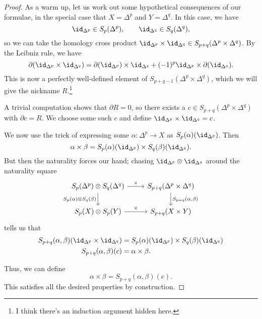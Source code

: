 \documentclass[main.tex]{subfiles}
\begin{document}
\begin{proof}
  As a warm up, let us work out some hypothetical consequences of our formulae, in the special case that $X = \Delta^{p}$ and $Y = \Delta^{q}$. In this case, we have
  \begin{equation*}
    \id_{\Delta^{p}} \in S_{p}(\Delta^{p}),\qquad \id_{\Delta^{q}} \in S_{q}(\Delta^{q}),
  \end{equation*}
  so we can take the homology cross product $\id_{\Delta^{p}} \times \id_{\Delta^{q}} \in S_{p+q}(\Delta^{p} \times \Delta^{q})$. By the Leibniz rule, we have
  \begin{equation*}
    \partial(\id_{\Delta^{p}} \times \id_{\Delta^{q}}) = \partial(\id_{\Delta^{p}}) \times \id_{\Delta^{q}} + (-1)^{p} \id_{\Delta^{p}} \times \partial(\id_{\Delta^{q}}).
  \end{equation*}
  This is now a perfectly well-defined element of $S_{p+q-1}(\Delta^{p} \times \Delta^{q})$, which we will give the nickname $R$.\footnote{I think there's an induction argument hidden here.}

  A trivial computation shows that $\partial R = 0$, so there exists a $c \in S_{p+q}(\Delta^{p} \times \Delta^{q})$ with $\partial c = R$. We choose some such $c$ and define $\id_{\Delta^{p}} \times \id_{\Delta^{q}} = c$.

  We now use the trick of expressing some $\alpha\colon \Delta^{p} \to X$ as $S_{p}(\alpha)(\id_{\Delta^{p}})$. Then
  \begin{equation*}
    \alpha \times \beta = S_{p}(\alpha)(\id_{\Delta^{p}}) \times S_{q}(\beta)(\id_{\Delta^{q}}).
  \end{equation*}
  But then the naturality forces our hand; chasing $\id_{\Delta^{p}} \otimes \id_{\Delta^{q}}$ around the naturality square
  \begin{equation*}
    \begin{tikzcd}
      S_{p}(\Delta^{p}) \otimes S_{q}(\Delta^{q})
      \arrow[r, "\times"]
      \arrow[d, swap, "{S_{p}(\alpha) \otimes S_{q}(\beta)}"]
      & S_{p+q}(\Delta^{p} \times \Delta^{q})
      \arrow[d, "{S_{p+q}(\alpha, \beta)}"]
      \\
      S_{p}(X) \otimes S_{p}(Y)
      \arrow[r, "\times"]
      & S_{p+q}(X \times Y)
    \end{tikzcd}
  \end{equation*}
  tells us that
  \begin{align*}
    S_{p+q}(\alpha, \beta)(\id_{\Delta^{p}} \times \id_{\Delta^{q}}) &= S_{p}(\alpha)(\id_{\Delta^{p}}) \times S_{q}(\beta)(\id_{\Delta^{q}}) \\
    S_{p+q}(\alpha, \beta)(c) &= \alpha \times \beta.
  \end{align*}

  Thus, we can define
  \begin{equation*}
    \alpha \times \beta = S_{p+q}(\alpha, \beta)(c).
  \end{equation*}
  This satisfies all the desired properties by construction.
\end{proof}
\end{document}

